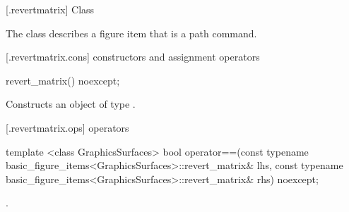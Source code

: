  [\iotwod.revertmatrix] {Class }

\pnum
{}%
The class  describes a figure item that is a path command.

 [\iotwod.revertmatrix.cons] { constructors and assignment operators}

%
\begin{itemdecl}
revert_matrix() noexcept;
\end{itemdecl}
\begin{itemdescr}
\pnum
\effects
Constructs an object of type .
\end{itemdescr}

 [\iotwod.revertmatrix.ops]{ operators}

%
\begin{itemdecl}
template <class GraphicsSurfaces>
bool operator==(const typename basic_figure_items<GraphicsSurfaces>::revert_matrix& lhs,
  const typename basic_figure_items<GraphicsSurfaces>::revert_matrix& rhs) noexcept;
\end{itemdecl}
\begin{itemdescr}
\pnum
\returns
{}.
\end{itemdescr}
